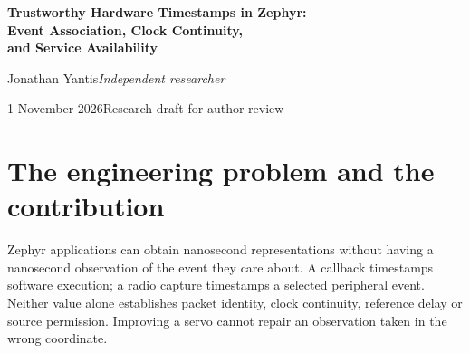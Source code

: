 \documentclass[10pt,letterpaper]{article}
\begin{document}
\begin{center}
{\LARGE\bfseries Trustworthy Hardware Timestamps in Zephyr:\\[3pt]
Event Association, Clock Continuity,\\[3pt] and Service Availability}\par
\vspace{7pt}Jonathan Yantis\quad\textit{Independent researcher}\par
1 November 2026\quad Research draft for author review
\end{center}
\vspace{-5pt}
\begin{abstract}\noindent
A hardware capture can be precise yet unusable because it belongs to another packet, a discontinued counter, or a clock model evaluated with stale processing time. This paper examines those integration problems in PToB's Zephyr/nRF52840 timing implementation. It describes controller-owned radio event association, one continuously extended capture domain, bounded snapshot readers, independent continuity checks, and coherent source evaluation. A concrete publication-order counterexample explains how newly published PPS or GNSS metadata can appear to be future input and interrupt qualification. These mechanisms build on established synchronization, timestamping and concurrency techniques; the contribution is an inspectable implementation account and a falsifiable evaluation method. Historical relative-PPS evidence is retained with its full population: 436 usable observations among 602 nominal opportunities, including invalid references, expired maps and missing witnesses. No new comparative hardware experiment is reported. The paper gives practical contracts and tests that can inform Zephyr's evolving precision-event infrastructure while keeping capture resolution, delivered agreement, service availability and calibrated accuracy distinct.
\end{abstract}
\vspace{-5pt}
\section{The engineering problem and the contribution}
Zephyr applications can obtain nanosecond representations without having a nanosecond observation of the event they care about. A callback timestamps software execution; a radio capture timestamps a selected peripheral event. Neither value alone establishes packet identity, clock continuity, reference delay or source permission. Improving a servo cannot repair an observation taken in the wrong coordinate.
\end{document}
